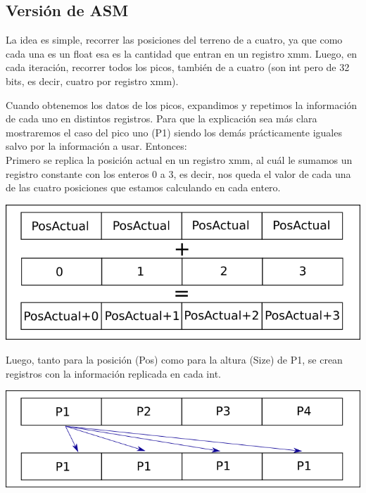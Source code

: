 \subsection{Versión de ASM}
La idea es simple, recorrer las posiciones del terreno de a cuatro, ya que como cada una es un float esa es la cantidad que entran en un registro xmm. 
Luego, en cada iteración, recorrer todos los picos, también de a cuatro (son int pero de 32 bits, es decir, cuatro por registro xmm).

Cuando obtenemos los datos de los picos, expandimos y repetimos la información de cada uno en distintos registros. 
Para que la explicación sea más clara mostraremos el caso del pico uno (P1) siendo los demás prácticamente iguales salvo por la información a usar. Entonces:\\

Primero se replica la posición actual en un registro xmm, al cuál le sumamos un registro constante con los enteros 0 a 3, es decir, nos queda el valor de cada una de las cuatro posiciones que estamos calculando en cada entero.

\begin{center}
\includegraphics[scale=0.5]{imagenes/posActual.png} 
\end{center}

Luego, tanto para la posición (Pos) como para la altura (Size) de P1, se crean registros con la información replicada en cada int.

\begin{center}
\includegraphics[scale=0.5]{imagenes/P1replicaInfo.png} 
\end{center}

